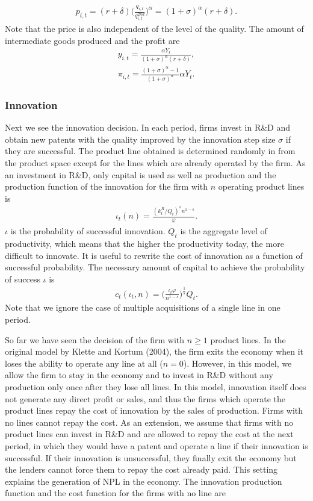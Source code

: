 \documentclass[a4paper,12pt]{article}
\begin{document}
\begin{align}
    p_{i,t} = (r+\delta)\Big(\frac{q_{i,t}}{q_{i,t}^{2nd}}\Big)^\alpha = (1+\sigma)^\alpha(r+\delta).
\end{align}
Note that the price is also independent of the level of the quality. The amount of intermediate goods produced and the profit are
\begin{align}
    y_{i,t} = \frac{\alpha Y_t}{(1+\sigma)^\alpha(r+\delta)},\\
    \pi_{i,t} = \frac{(1+\sigma)^\alpha-1}{(1+\sigma)^\alpha}\alpha Y_t .
\end{align}

\subsubsection{Innovation}
Next we see the innovation decision. In each period, firms invest in R\&D and obtain new patents with the quality improved by the innovation step size $\sigma$ if they are successful. The product line obtained is determined randomly in from the product space except for the lines which are already operated by the firm. As an investment in R\&D, only capital is used as well as production and the production function of the innovation for the firm with $n$ operating product lines is
\begin{align}
    \iota_t(n) = \frac{(k_t^R/Q_t)^sn^{1-s}}{\varphi}.
\end{align}
$\iota$ is the probability of successful innovation. $Q_t$ is the aggregate level of productivity, which means that the higher the productivity today, the more difficult to innovate. It is useful to rewrite the cost of innovation as a function of successful probability. The necessary amount of capital to achieve the probability of success $\iota$ is
\begin{align}
    c_t(\iota_t, n) = \Big(\frac{\iota_t\varphi}{n^{1-s}}\Big)^\frac{1}{s} Q_t.
\end{align}
Note that we ignore the case of multiple acquisitions of a single line in one period. \par
So far we have seen the decision of the firm with $n\geq 1$ product lines. In the original model by Klette and Kortum (2004), the firm exits the economy when it loses the ability to operate any line at all ($n=0$). However, in this model, we allow the firm to stay in the economy and to invest in R\&D without any production only once after they lose all lines. In this model, innovation itself does not generate any direct profit or sales, and thus the firms which operate the product lines repay the cost of innovation by the sales of production. Firms with no lines cannot repay the cost. As an extension, we assume that firms with no product lines can invest in R\&D and are allowed to repay the cost at the next period, in which they would have a patent and operate a line if their innovation is successful. If their innovation is unsuccessful, they finally exit the economy but the lenders cannot force them to repay the cost already paid. This setting explains the generation of NPL in the economy. The innovation production function and the cost function for the firms with no line are
\end{document}
